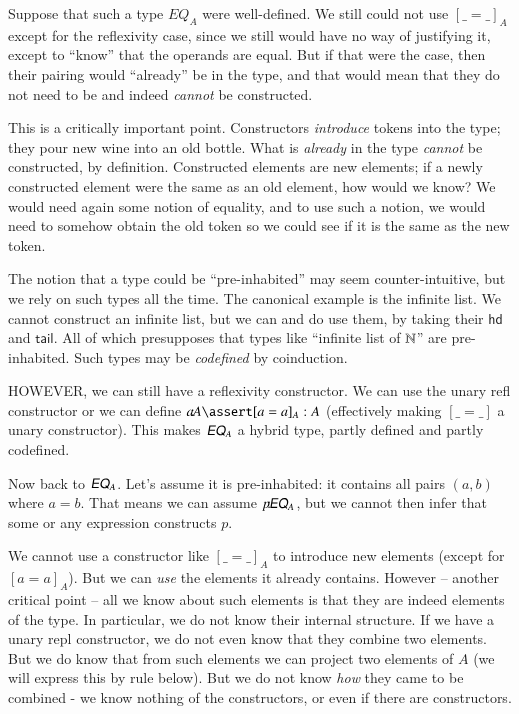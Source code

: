 \documentclass{article}
\begin{document}
Suppose that such a type \(EQ_A\) were well-defined. We still could
not use \([\_=\_]_A\) except for the reflexivity case, since we still
would have no way of justifying it, except to ``know'' that the
operands are equal. But if that were the case, then their pairing
would ``already'' be in the type, and that would mean that they do not
need to be and indeed \textit{cannot} be constructed.

This is a critically important point. Constructors \textit{introduce}
tokens into the type; they pour new wine into an old bottle. What is
\textit{already} in the type \textit{cannot} be constructed, by
definition. Constructed elements are new elements; if a newly
constructed element were the same as an old element, how would we
know? We would need again some notion of equality, and to use such a
notion, we would need to somehow obtain the old token so we could see
if it is the same as the new token.

The notion that a type could be ``pre-inhabited'' may seem
counter-intuitive, but we rely on such types all the time. The
canonical example is the infinite list. We cannot construct an
infinite list, but we can and do use them, by taking their
\(\textsf{hd}\) and \(\textsf{tail}\). All of which presupposes that
types like ``infinite list of \(\mathbb{N}\)'' are pre-inhabited. Such types
may be \textit{codefined} by coinduction.

HOWEVER, we can still have a reflexivity constructor. We can use the
unary \textsf{refl} constructor or we can define \(a\type A\linfer
[a=a]_A:A\) (effectively making \([\_=\_]\) a unary constructor). This makes
  \(\EQ_A\) a hybrid type, partly defined and partly codefined.

Now back to \(\EQ_A\). Let's assume it is pre-inhabited: it contains
all pairs \((a,b)\) where \(a=b\). That means we can assume
\(p\type\EQ_A\), but we cannot then infer that some or any expression
constructs \(p\).

 We cannot use a constructor like \([\_=\_]_A\) to introduce new
 elements (except for \([a=a]_A\)). But we can \textit{use} the
 elements it already contains. However -- another critical point --
 all we know about such elements is that they are indeed elements of
 the type. In particular, we do not know their internal structure. If
 we have a unary repl constructor, we do not even know that they
 combine two elements. But we do know that from such elements we can
 project two elements of \(A\) (we will express this by rule below).
 But we do not know \textit{how} they came to be combined - we know
 nothing of the constructors, or even if there are constructors.
\end{document}
